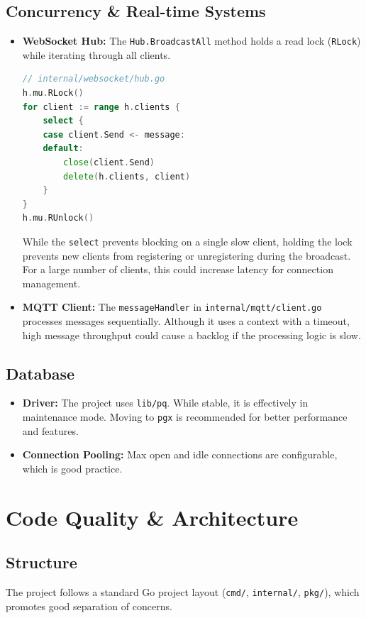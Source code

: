 \documentclass{article}
\begin{document}
\subsection{Concurrency \& Real-time Systems}
\begin{itemize}
    \item \textbf{WebSocket Hub:} The \texttt{Hub.BroadcastAll} method holds a read lock (\texttt{RLock}) while iterating through all clients.
    \begin{lstlisting}[language=Go, basicstyle=\small]
// internal/websocket/hub.go
h.mu.RLock()
for client := range h.clients {
    select {
    case client.Send <- message:
    default:
        close(client.Send)
        delete(h.clients, client)
    }
}
h.mu.RUnlock()
    \end{lstlisting}
    While the \texttt{select} prevents blocking on a single slow client, holding the lock prevents new clients from registering or unregistering during the broadcast. For a large number of clients, this could increase latency for connection management.

    \item \textbf{MQTT Client:} The \texttt{messageHandler} in \texttt{internal/mqtt/client.go} processes messages sequentially. Although it uses a context with a timeout, high message throughput could cause a backlog if the processing logic is slow.
\end{itemize}

\subsection{Database}
\begin{itemize}
    \item \textbf{Driver:} The project uses \texttt{lib/pq}. While stable, it is effectively in maintenance mode. Moving to \texttt{pgx} is recommended for better performance and features.
    \item \textbf{Connection Pooling:} Max open and idle connections are configurable, which is good practice.
\end{itemize}

\section{Code Quality \& Architecture}

\subsection{Structure}
The project follows a standard Go project layout (\texttt{cmd/}, \texttt{internal/}, \texttt{pkg/}), which promotes good separation of concerns.
\end{document}

